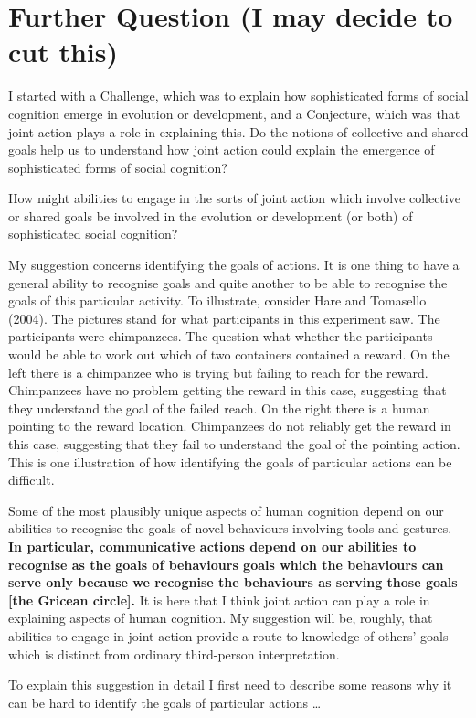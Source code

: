\documentclass[12pt,a4paper]{extarticle}
\begin{document}
\section{Further Question (I may decide to cut this)}
I started with a Challenge, which was to explain how sophisticated forms of social cognition emerge in evolution or development, 
and a Conjecture, which was that joint action plays a role in explaining this.
Do the notions of collective and shared goals help us to understand how joint action could explain the emergence of sophisticated forms of social cognition?

How might abilities to engage in the sorts of joint action 
which involve collective or shared goals 
be involved in the evolution or development (or both) of sophisticated social cognition?

My suggestion concerns identifying the goals of actions. 
It is one thing to have a general ability to recognise goals and quite another to be able to recognise the goals of this particular activity.
To illustrate, consider Hare and Tomasello (2004).
The pictures stand for what participants in this experiment saw.
The participants were chimpanzees.
The question what whether the participants would be able to work out which of two containers contained a reward.
On the left there is a chimpanzee who is trying but failing to reach for the reward. 
Chimpanzees have no problem getting the reward in this case, suggesting that they understand the goal of the failed reach.
On the right there is a human pointing to the reward location.
Chimpanzees do not reliably  get the reward in this case, suggesting that they fail to understand the goal of the pointing action.
This is one illustration of how identifying the goals of particular actions can be difficult.
 
Some of the most plausibly unique aspects of human cognition depend on our abilities to recognise the goals of novel behaviours involving tools and gestures.  
\textbf{In particular, communicative actions depend on our abilities to recognise as the goals of behaviours goals which the behaviours can serve only because we recognise the behaviours as serving those goals [the Gricean circle].}
It is here that I think joint action can play a role in explaining aspects of human cognition.  
My suggestion will be, roughly, that abilities to engage in joint action provide a route to knowledge of others’ goals which is distinct from ordinary third-person interpretation.  

To explain this suggestion in detail I first need to describe some reasons why it can be hard to identify the goals of particular actions …
\end{document}
